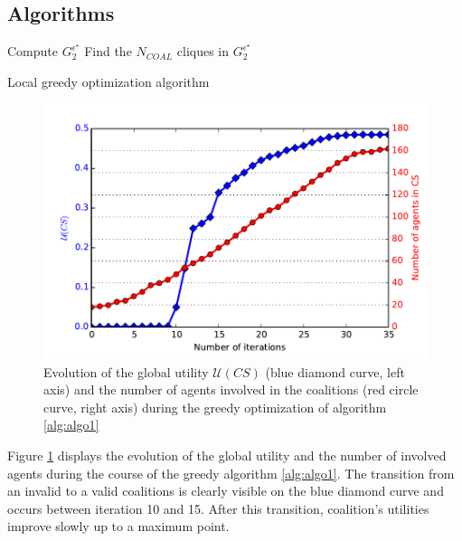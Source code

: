 \documentclass[journal]{IEEEtran}
\begin{document}
\pagestyle{plain}


\appendix
\subsection{Algorithms}


\begin{algorithm}
 Compute $ G_{2}^{\epsilon^{\star}} $ \;
 Find the $ N_{COAL} $ cliques in $ G_{2}^{\epsilon^{\star}} $\;
 \caption{Local greedy optimization algorithm}
 \label{alg:algo1}
\end{algorithm}

\begin{figure}[b]
\includegraphics[scale=.5]{./figs/figure_7}
\caption{Evolution of the global utility $ \mathcal{U}(CS) $ (blue diamond curve, left axis) and the number of agents involved in the coalitions (red circle curve, right axis) during the greedy optimization of algorithm \ref{alg:algo1} }
\label{fig:search}
\end{figure}

Figure \ref{fig:search} displays the evolution of the global utility and the number of involved agents during the course of the greedy algorithm \ref{alg:algo1}. The transition from an invalid to a valid coalitions is clearly visible on the blue diamond curve and occurs between iteration 10 and 15. After this transition, coalition's utilities improve slowly up to a maximum point. 
\end{document}
